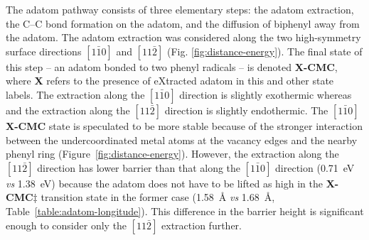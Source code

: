 \documentclass[aps,prb,amsmath,amssymb,11pt]{revtex4-1}
\begin{document}
The adatom pathway consists of three elementary steps: the adatom extraction, the C--C bond formation on the adatom, and the diffusion of biphenyl away from the adatom. %
%
The adatom extraction was considered along the two high-symmetry surface directions $[1\bar{1}0]$ and $[11\bar{2}]$ (Fig. \ref{fig:distance-energy}). The final state of this step -- an adatom bonded to two phenyl radicals -- is denoted \textbf{X-CMC}, where \textbf{X} refers to the presence of eXtracted adatom in this and other state labels. 
%
The extraction along the $[1\bar{1}0]$ direction is slightly exothermic whereas and the extraction along the $[11\bar{2}]$ direction is slightly endothermic. The $[1\bar{1}0]$ \textbf{X-CMC} state is speculated to be more stable because of the stronger interaction between the undercoordinated metal atoms at the vacancy edges and the nearby phenyl ring (Figure~\ref{fig:distance-energy}).
%
%
However, the extraction along the $[11\bar{2}]$ direction has lower barrier than that along the $[1\bar{1}0]$ direction (\SI{0.71}{\electronvolt} \emph{vs} \SI{1.38}{\electronvolt}) because the adatom does not have to be lifted as high in the \textbf{X-CMC$\ddagger$} transition state in the former case (\SI{1.58}{\angstrom} \emph{vs} \SI{1.68}{\angstrom}, Table~\ref{table:adatom-longitude}). This difference in the barrier height is significant enough to consider only the $[11\bar{2}]$ extraction further.
\end{document}
